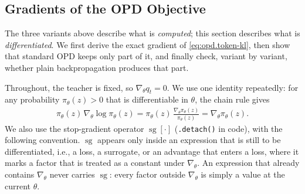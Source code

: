 \subsection{Gradients of the OPD Objective}
\label{sec:opd.gradients}

The three variants above describe what is \emph{computed}; this section describes what
is \emph{differentiated}. We first derive the exact gradient of
\eqref{eq:opd.token-kl}, then show that standard OPD keeps only part of it, and finally
check, variant by variant, whether plain backpropagation produces that part.

Throughout, the teacher is fixed, so $\nabla_\theta q_t=0$. We use one identity
repeatedly: for any probability $\pi_\theta(z)>0$ that is differentiable in $\theta$,
the chain rule gives
\begin{align}
    \pi_\theta(z)\,\nabla_\theta\log\pi_\theta(z)
    =
    \pi_\theta(z)\,\frac{\nabla_\theta\pi_\theta(z)}{\pi_\theta(z)}
    =
    \nabla_\theta\pi_\theta(z).
    \label{eq:opd.log-derivative}
\end{align}
We also use the stop-gradient operator $\operatorname{sg}[\cdot]$ (\texttt{.detach()} in code), with
the following convention. $\operatorname{sg}$ appears only inside an expression that is still to
be differentiated, i.e., a loss, a surrogate, or an advantage that enters a loss, where it marks a
factor that is treated as a constant under $\nabla_\theta$. An expression that already contains
$\nabla_\theta$ never carries $\operatorname{sg}$: every factor outside $\nabla_\theta$ is simply a
value at the current $\theta$.

